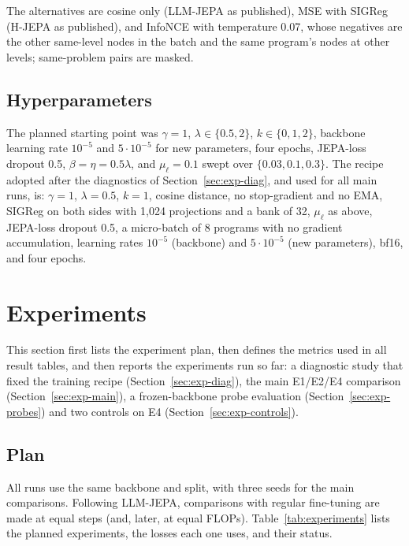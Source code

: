 \documentclass[11pt]{article}
\begin{document}
The alternatives are cosine only (LLM-JEPA as published), MSE with SIGReg (H-JEPA as published), and InfoNCE with
temperature 0.07, whose negatives are the other same-level nodes in the batch and the same program's nodes at other
levels; same-problem pairs are masked.

\subsection{Hyperparameters}
The planned starting point was $\gamma=1$, $\lambda\in\{0.5,2\}$, $k\in\{0,1,2\}$, backbone learning rate $10^{-5}$
and $5\cdot10^{-5}$ for new parameters, four epochs, JEPA-loss dropout 0.5, $\beta=\eta=0.5\lambda$, and
$\mu_\ell=0.1$ swept over $\{0.03,0.1,0.3\}$. The recipe adopted after the diagnostics of
Section~\ref{sec:exp-diag}, and used for all main runs, is:
$\gamma=1$, $\lambda=0.5$, $k=1$, cosine distance, no stop-gradient and no EMA, SIGReg on both sides with 1{,}024
projections and a bank of 32, $\mu_\ell$ as above, JEPA-loss dropout 0.5, a micro-batch of 8 programs with no
gradient accumulation, learning rates $10^{-5}$ (backbone) and $5\cdot10^{-5}$ (new parameters), bf16, and
four epochs.

\section{Experiments}
\label{sec:experiments}

This section first lists the experiment plan, then defines the metrics used in all result tables, and then
reports the experiments run so far: a diagnostic study that fixed the training recipe
(Section~\ref{sec:exp-diag}), the main E1/E2/E4 comparison (Section~\ref{sec:exp-main}), a frozen-backbone probe
evaluation (Section~\ref{sec:exp-probes}) and two controls on E4 (Section~\ref{sec:exp-controls}).

\subsection{Plan}

All runs use the same backbone and split, with three seeds for the main comparisons. Following LLM-JEPA,
comparisons with regular fine-tuning are made at equal steps (and, later, at equal FLOPs).
Table~\ref{tab:experiments} lists the planned experiments, the losses each one uses, and their status.
\end{document}
